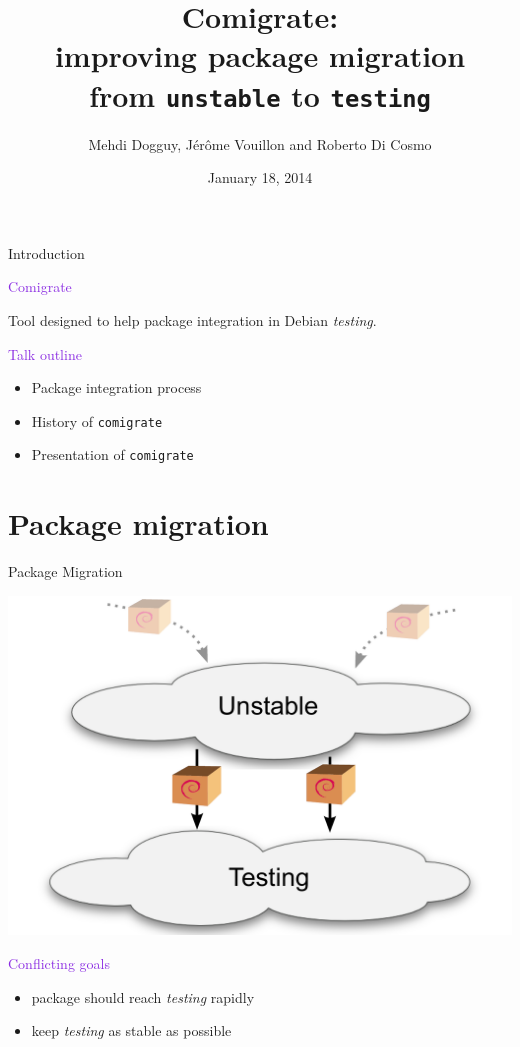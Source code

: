 \documentclass[xcolor={dvipsnames}]{beamer}
\title[Comigrate]%
{Comigrate: \\ improving package migration \\
 from \texttt{unstable} to \texttt{testing}}
\author[Di Cosmo/Dogguy/Vouillon]{Mehdi Dogguy, J\'er\^ome Vouillon and Roberto Di Cosmo}
\date[2014-01-18]{January 18, 2014}
\newcommand{\EEE}[1]{\textcolor{BlueViolet}{#1}}
\begin{document}
\begin{frame}[label=title]{}
 \titlepage
 \vspace{-1.5cm}
 \begin{center}
 \end{center}
\end{frame}

\begin{frame}{Introduction}

\EEE{Comigrate}

Tool designed to help package integration in Debian \textit{testing}.

\vspace{3em}

\EEE{Talk outline}
\begin{itemize}
\item Package integration process
\item History of \texttt{comigrate}
\item Presentation of \texttt{comigrate}
\end{itemize}
\end{frame}

\part{Package migration}
\frame{\partpage}

\begin{frame}{Package Migration}

\begin{center}
\includegraphics[width=0.7\linewidth]{figures/migration}
\end{center}

\vspace{-1em}
\EEE{Conflicting goals}
\begin{itemize}
\item package should reach \textit{testing} rapidly
\item keep \textit{testing} as stable as possible
\end{itemize}

\end{frame}
\end{document}
